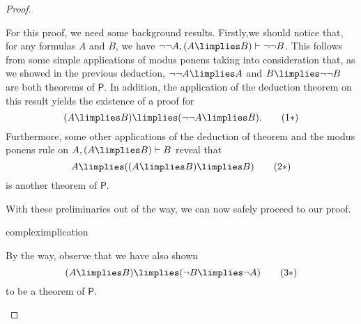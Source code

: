 \begin{proof}
\begin{parlist}
\item For this proof, we need some background results.
Firstly,we should notice that, for any formulas $A$ and $B$, we have $\lnot\lnot A, (A\limplies B) \vdash \lnot\lnot B$.
This follows from some simple applications of modus ponens taking into consideration that, as we showed in the previous deduction, $\lnot\lnot A \limplies A$ and $B \limplies \lnot\lnot B$ are both theorems of $\mathsf{P}$.
In addition, the application of the deduction theorem on this result yields the existence of a proof for
\begin{equation}
(A\limplies B) \limplies (\lnot\lnot A \limplies B).
\tag{$1*$}
\label{prelp31}
\end{equation}
Furthermore, some other applications of the deduction of theorem and the modus ponens rule on $A,(A\limplies B) \vdash B$ reveal that
\begin{equation}
A \limplies ( (A \limplies B) \limplies B)
\tag{$2*$}
\label{prelp32}
\end{equation}
is another theorem of $\mathsf{P}$.

With these preliminaries out of the way, we can now safely proceed to our proof.
\begin{deduction}{compleximplication}
\end{deduction}
By the way, observe that we have also shown
\begin{equation}
(A \limplies B) \limplies (\lnot B \limplies \lnot A)
\tag{$3*$}
\label{axp3vv}
\end{equation}
to be a theorem of $\mathsf{P}$.


\end{parlist}
\end{proof}
